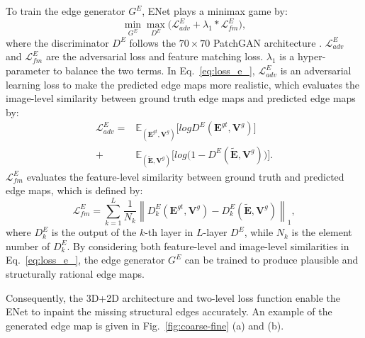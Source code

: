 To train the edge generator $G^E$, ENet plays a minimax game by:
\begin{equation}
	\label{eq:loss_e_}
	\min\limits_{G^E} \max \limits_{D^E} \big(\mathcal{L}^E_{adv}+\lambda_1 * \mathcal{L}^E_{fm}\big),
\end{equation}
where the discriminator $D^E$ follows the $70\times 70$ PatchGAN architecture \cite{Isola_2017_CVPR}. 
$\mathcal{L}^E_{adv}$ and $\mathcal{L}^E_{fm}$ are the adversarial loss and feature matching loss. 
$\lambda_1$ is a hyper-parameter to balance the two terms.
%
In Eq.~\eqref{eq:loss_e_}, $\mathcal{L}^E_{adv}$ is an adversarial learning loss to make the predicted edge maps more realistic, which evaluates the image-level similarity between ground truth edge maps and predicted edge maps by:
\begin{equation} \label{eq:edge_adver}
	\begin{aligned} 
		\mathcal{L}^E_{adv}  =&\mathbb{E}_{(\boldsymbol{E}^{gt},\boldsymbol{V}^{g})}\big[logD^E(\boldsymbol{E}^{gt},\boldsymbol{V}^{g})\big]\\ 
		+&\mathbb{E}_{(\boldsymbol{\widetilde{E}},\boldsymbol{V}^{g})}\big[log\big(1-D^E ( \boldsymbol{\widetilde{E}},\boldsymbol{V}^{g})\big)\big].
	\end{aligned}
\end{equation}
$\mathcal{L}^E_{fm}$ evaluates the feature-level similarity between ground truth and predicted edge maps, which is defined by:
\begin{equation}
	\label{eq:edge_fm}
	\mathcal{L}^E_{fm}=\sum_{k=1}^L{\frac{1}{N_k}\left\| D^E_k(\boldsymbol{E}^{gt},\boldsymbol{V}^{g})- D^E_k(\boldsymbol{\widetilde{E}},\boldsymbol{V}^{g})\right\|_1},
\end{equation}
where $D^E_k$ is the output of the $k$-th layer in $L$-layer $D^E$, while $N_k$ is the element number of $D^E_k$.
By considering both feature-level and image-level similarities in Eq.~\eqref{eq:loss_e_}, the edge generator $G^E$ can be trained to produce plausible and structurally rational edge maps.

Consequently, the 3D+2D architecture and two-level loss function enable the ENet to inpaint the missing structural edges accurately.
An example of the generated edge map is given in Fig.~\ref{fig:coarse-fine} (a) and (b).






